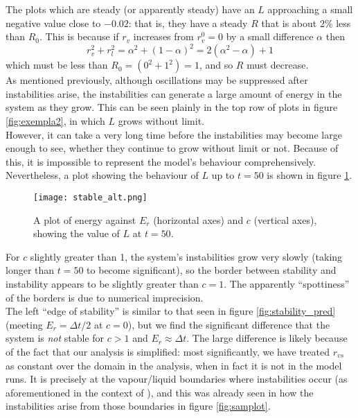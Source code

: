 \documentclass[11pt]{article}
\begin{document}
The plots which are steady (or apparently steady) have an $L$ approaching a small negative value close to $-0.02$: that is, they have a steady $R$ that is about 2\% less than $R_0$. This is because if $r_v$ increases from $r^0_v=0$ by a small difference $\alpha$ then
\[
r_v^2 + r_l^2 = \alpha^2 + (1-\alpha)^2 = 2\left(\alpha^2 - \alpha\right) + 1
\]
which must be less than $R_0 = (0^2 + 1^2) = 1$, and so $R$ must decrease. \\
As mentioned previously, although oscillations may be suppressed after instabilities arise, the instabilities can generate a large amount of energy in the system as they grow. This can be seen plainly in the top row of plots in figure \ref{fig:exempla2}, in which $L$ grows without limit. \\
However, it can take a very long time before the instabilities may become large enough to see, whether they continue to grow without limit or not. Because of this, it is impossible to represent the model's behaviour comprehensively. Nevertheless, a plot showing the behaviour of $L$ up to $t=50$ is shown in figure \ref{fig:stable_alt}.
\begin{figure}[H]
\centering
\texttt{[image: stable\_alt.png]}
\caption{A plot of energy against $E_r$ (horizontal axes) and $c$ (vertical axes), showing the value of $L$ at $t=50$.}
\label{fig:stable_alt}
\end{figure}
For $c$ slightly greater than 1, the system's instabilities grow very slowly (taking longer than $t=50$ to become significant), so the border between stability and instability appears to be slightly greater than $c=1$. The apparently ``spottiness'' of the borders is due to numerical imprecision. \\
The left ``edge of stability'' is similar to that seen in figure \ref{fig:stability_pred} (meeting $E_r=\Delta t/2$ at $c=0$), but we find the significant difference that the system is \emph{not} stable for $c>1$ and $E_r\approx\Delta t$. The large difference is likely because of the fact that our analysis is simplified: most significantly, we have treated $r_{vs}$ as constant over the domain in the analysis, when in fact it is not in the model runs. It is precisely at the vapour/liquid boundaries where instabilities occur (as aforementioned in the context of \citet{GS1990}), and this was already seen in how the instabilities arise from those boundaries in figure \ref{fig:samplot}.
\end{document}
